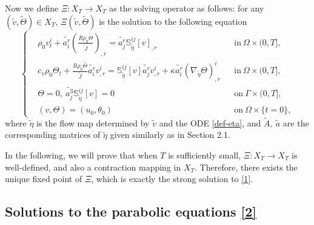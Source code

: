 \documentclass[12pt,a4paper]{amsart}
\numberwithin{equation}{section}
\theoremstyle{plain}
\theoremstyle{definition}
\begin{document}
Now we define $\Xi: X_T\rightarrow X_T$ as the solving operator as follows: for any $(\widetilde{v},\widetilde{\Theta})\in X_T$, $\Xi(\widetilde{v}, \widetilde{\Theta})$ is the solution to the following equation
\begin{equation}
\label{2}
\left\{
\begin{aligned}
& \rho_0 v^i_t+\widetilde{a^r_i}(\frac{R\rho_0 \widetilde{\Theta}}{\widetilde{J}})_{,r} = \widetilde{a^r_j} \mathbb{S}^{ij}_{\widetilde{\eta}}[v]_{,r} &&\text{in}\ \Omega\times(0,T],\\
& c_v \rho_0\Theta_t +\frac{R\rho_0\widetilde{\Theta}}{\widetilde{J}}\widetilde{a^r_i}v^i_{,r}=  \mathbb{S}^{ij}_{\widetilde{\eta}}[v]\widetilde{a^r_j}v^i_{,r}
+\kappa \widetilde{a^r_i}(\nabla_{\widetilde{\eta}}\Theta)^i_{,r} &&\text{in}\ \Omega\times(0,T],\\
& \Theta=0,\ \widetilde{a_j^3} \mathbb{S}_{\widetilde{\eta}}^{ij}[v]=0 &&\text{on}\ \Gamma\times(0,T],\\
& (v,\Theta)=(u_0,\theta_0) && \text{on}\ \Omega\times\{t=0 \},
\end{aligned}
\right. 
\end{equation}
where $\widetilde{\eta}$ is the flow map determined by $\widetilde{v}$ and the ODE \eqref{def-eta}, and  $\widetilde{A},~\widetilde{a}$ are the corresponding matrices of $\widetilde{\eta}$ given similarly as in Section 2.1.


In the following, we will prove that when $T$ is sufficiently small, $\Xi:X_T\rightarrow X_T$ is well-defined, and also a contraction mapping in $X_T$. Therefore, there exists the unique fixed point of $\Xi$, which is exactly the strong solution to \eqref{1}.

\vspace{0.3cm}



\subsection{Solutions to the parabolic equations \eqref{2}}~
\end{document}

